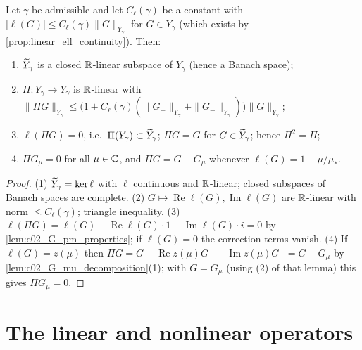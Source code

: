 \begin{lemma}
  \label{lem:c02_Pi_bounded_projection}
  Let $\gamma$ be admissible and let $C_\ell(\gamma)$ be a constant with $|\ell(G)|\le C_\ell(\gamma)\|G\|_{Y_\gamma}$
  for $G\in Y_\gamma$ (which exists by \cref{prop:linear_ell_continuity}). Then:
  \begin{enumerate}
    \item $\widetilde{Y}_\gamma$ is a closed $\mathbb{R}$-linear subspace of $Y_\gamma$ (hence a Banach space);
    \item $\Pi:Y_\gamma\to Y_\gamma$ is $\mathbb{R}$-linear with
      $\|\Pi G\|_{Y_\gamma}\le\bigl(1+C_\ell(\gamma)(\|G_+\|_{Y_\gamma}+\|G_-\|_{Y_\gamma})\bigr)\|G\|_{Y_\gamma}$;
    \item $\ell(\Pi G)=0$, i.e.\ $\Pi(Y_\gamma)\subset\widetilde{Y}_\gamma$; $\Pi G=G$ for $G\in\widetilde{Y}_\gamma$; hence $\Pi^2=\Pi$;
    \item $\Pi G_\mu=0$ for all $\mu\in\mathbb{C}$, and $\Pi G=G-G_\mu$ whenever $\ell(G)=1-\mu/\mu_*$.
  \end{enumerate}
\end{lemma}
\begin{proof}
  (1) $\widetilde{Y}_\gamma=\ker\ell$ with $\ell$ continuous and $\mathbb{R}$-linear; closed subspaces of Banach spaces are
  complete. (2) $G\mapsto\operatorname{Re}\ell(G),\operatorname{Im}\ell(G)$ are $\mathbb{R}$-linear with norm $\le C_\ell(\gamma)$; triangle inequality.
  (3) $\ell(\Pi G)=\ell(G)-\operatorname{Re}\ell(G)\cdot1-\operatorname{Im}\ell(G)\cdot i=0$ by \cref{lem:c02_G_pm_properties}; if $\ell(G)=0$ the
  correction terms vanish. (4) If $\ell(G)=z(\mu)$ then $\Pi G=G-\operatorname{Re}z(\mu)G_+-\operatorname{Im}z(\mu)G_-=G-G_\mu$ by
  \cref{lem:c02_G_mu_decomposition}(1); with $G=G_\mu$ (using (2) of that lemma) this gives $\Pi G_\mu=0$.
\end{proof}

\section{The linear and nonlinear operators}

